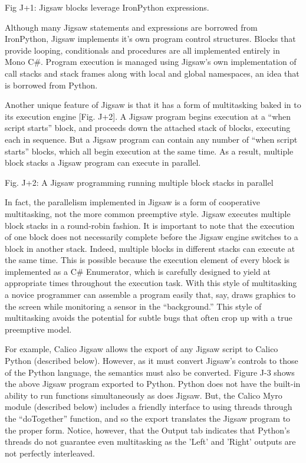 \documentclass[preprint]{sigplanconf}
\begin{document}
Fig J+1: Jigsaw blocks leverage IronPython expressions.

Although many Jigsaw statements and expressions are borrowed from
IronPython, Jigsaw implements it’s own program control
structures. Blocks that provide looping, conditionals and procedures
are all implemented entirely in Mono C\#. Program execution is managed
using Jigsaw’s own implementation of call stacks and stack frames
along with local and global namespaces, an idea that is borrowed from
Python.

Another unique feature of Jigsaw is that it has a form of multitasking
baked in to its execution engine [Fig. J+2]. A Jigsaw program begins
execution at a ``when script starts'' block, and proceeds down the
attached stack of blocks, executing each in sequence. But a Jigsaw
program can contain any number of ``when script starts'' blocks, which
all begin execution at the same time. As a result, multiple block
stacks a Jigsaw program can execute in parallel.


Fig. J+2: A Jigsaw programming running multiple block stacks in parallel

In fact, the parallelism implemented in Jigsaw is a form of
cooperative multitasking, not the more common preemptive style. Jigsaw
executes multiple block stacks in a round-robin fashion. It is
important to note that the execution of one block does not necessarily
complete before the Jigsaw engine switches to a block in another
stack. Indeed, multiple blocks in different stacks can execute at the
same time. This is possible because the execution element of every
block is implemented as a C\# Enumerator, which is carefully designed
to yield at appropriate times throughout the execution task. With this
style of multitasking a novice programmer can assemble a program
easily that, say, draws graphics to the screen while monitoring a
sensor in the ``background.'' This style of multitasking avoids the
potential for subtle bugs that often crop up with a true preemptive
model.

For example, Calico Jigsaw allows the export of any Jigsaw script to
Calico Python (described below). However, as it must convert Jigsaw's
controls to those of the Python language, the semantics must also be
converted. Figure J-3 shows the above Jigsaw program exported to
Python. Python does not have the built-in ability to run functions
simultaneously as does Jigsaw. But, the Calico Myro module (described
below) includes a friendly interface to using threads through the
``doTogether'' function, and so the export translates the Jigsaw
program to the proper form. Notice, however, that the Output tab
indicates that Python's threads do not guarantee even multitasking as
the 'Left' and 'Right' outputs are not perfectly interleaved.
\end{document}
